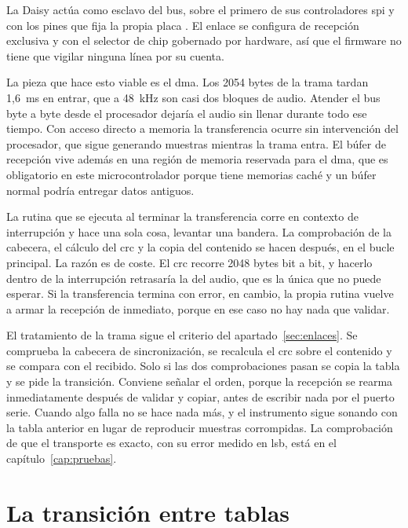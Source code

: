La Daisy actúa como esclavo del bus, sobre el primero de sus controladores
\gls{spi} y con los pines que fija la propia placa \cite{DaisySeed}. El enlace
se configura de recepción exclusiva y con el selector de chip gobernado por
hardware, así que el firmware no tiene que vigilar ninguna línea por su cuenta.

La pieza que hace esto viable es el \gls{dma}. Los 2054 bytes de la trama tardan
1,6~ms en entrar, que a 48~kHz son casi dos bloques de audio. Atender el bus
byte a byte desde el procesador dejaría el audio sin llenar durante todo ese
tiempo. Con acceso directo a memoria la transferencia ocurre sin intervención
del procesador, que sigue generando muestras mientras la trama entra. El búfer
de recepción vive además en una región de memoria reservada para el \gls{dma},
que es obligatorio en este microcontrolador porque tiene memorias caché y un
búfer normal podría entregar datos antiguos.

La rutina que se ejecuta al terminar la transferencia corre en contexto de
interrupción y hace una sola cosa, levantar una bandera. La comprobación de la
cabecera, el cálculo del \gls{crc} y la copia del contenido se hacen después,
en el bucle principal. La razón es de coste. El \gls{crc} recorre 2048 bytes
bit a bit, y hacerlo dentro de la interrupción retrasaría la del audio, que es
la única que no puede esperar. Si la transferencia termina con error, en cambio,
la propia rutina vuelve a armar la recepción de inmediato, porque en ese caso no
hay nada que validar.

El tratamiento de la trama sigue el criterio del apartado~\ref{sec:enlaces}. Se
comprueba la cabecera de sincronización, se recalcula el \gls{crc} sobre el
contenido y se compara con el recibido. Solo si las dos comprobaciones pasan se
copia la tabla y se pide la transición. Conviene señalar el orden, porque la recepción
se rearma inmediatamente después de validar y copiar, antes de escribir nada por el 
puerto serie. Cuando algo falla no se hace nada más, y el
instrumento sigue sonando con la tabla anterior en lugar de reproducir muestras
corrompidas. La comprobación de que el transporte es exacto, con su error medido
en \gls{lsb}, está en el capítulo~\ref{cap:pruebas}.

\section{La transición entre tablas}
\label{sec:crossfade}
\hypertarget{RE2.2b}{}\label{RE2.2b}

